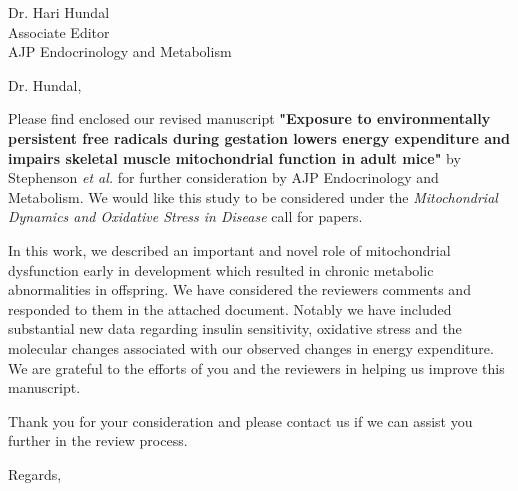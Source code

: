 \documentclass[a4paper,12pt]{letter}
\begin{document}
\begin{letter}{Dr. Hari Hundal\\Associate Editor\\AJP Endocrinology and Metabolism}

\opening{Dr. Hundal,} %

Please find enclosed our revised manuscript \textbf{"Exposure to environmentally persistent free radicals during gestation lowers energy expenditure and impairs skeletal muscle mitochondrial function in adult mice"} by Stephenson \textit{et al.} for further consideration by AJP Endocrinology and Metabolism.  We would like this study to be considered under the \emph{Mitochondrial Dynamics and Oxidative Stress in Disease} call for papers.

In this work, we described an important and novel role of mitochondrial dysfunction early in development which resulted in chronic metabolic abnormalities in offspring.  We have considered the reviewers comments and responded to them in the attached document.  Notably we have included substantial new data regarding insulin sensitivity, oxidative stress and the molecular changes associated with our observed changes in energy expenditure.  We are grateful to the efforts of you and the reviewers in helping us improve this manuscript.

Thank you for your consideration and please contact us if we can assist you further in the review process.

\closing{Regards,} %


\end{letter}
\end{document}
